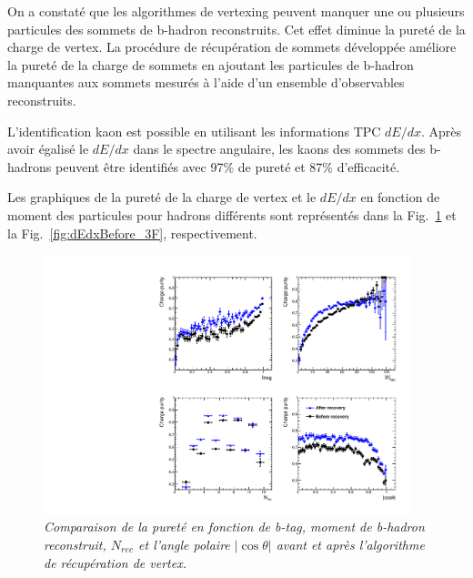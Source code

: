 On a constaté que les algorithmes de vertexing peuvent manquer une ou plusieurs particules des sommets de b-hadron reconstruits. Cet effet diminue la pureté de la charge de vertex.
La procédure de récupération de sommets développée améliore la pureté de la charge de sommets en ajoutant les particules de b-hadron manquantes aux sommets mesurés à l'aide d'un ensemble d'observables reconstruits.

L'identification kaon est possible en utilisant les informations TPC $dE/dx$. Après avoir égalisé le $dE/dx$ dans le spectre angulaire, les kaons des sommets des b-hadrons peuvent être identifiés avec 97\% de pureté et 87\% d'efficacité.

Les graphiques de la pureté de la charge de vertex et le $dE/dx$ en fonction de moment des particules pour hadrons différents sont représentés dans la Fig.~\ref{fig:RecoveryPurityComparison_3F} et la Fig.~\ref{fig:dEdxBefore_3F}, respectivement.

\begin{figure}
	{\centering
		\includegraphics[width=0.95\textwidth]{ILD/plots/recovery-purity-comparison.pdf}
		\caption{\sl Comparaison de la pureté en fonction de b-tag, moment de b-hadron reconstruit, $N_ {rec}$ et l'angle polaire $|\cos\theta|$ avant et après l'algorithme de récupération de vertex. 
		}
		\label{fig:RecoveryPurityComparison_3F}
	}
\end{figure}

